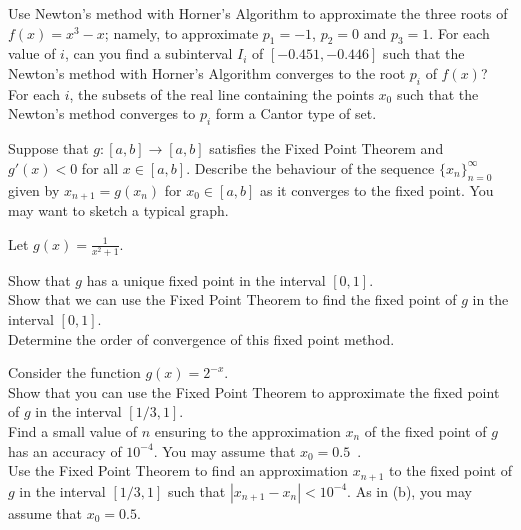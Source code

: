 \begin{question}
Use Newton's method with Horner's Algorithm to approximate the
three roots of $f(x) = x^3 -x$; namely, to approximate $p_1=-1$,
$p_2=0$ and $p_3=1$.  For each value of $i$, can you find a subinterval
$I_i$ of $[-0.451,-0.446]$ such that the Newton's method with Horner's
Algorithm converges to the root $p_i$ of $f(x)$?  For each $i$,
the subsets of the real line containing the points $x_0$ such that
the Newton's method converges to $p_i$ form a Cantor type of set.
\label{solvAQ14}
\end{question}

\begin{question}
Suppose that $g:[a,b] \rightarrow [a,b]$ satisfies the Fixed Point
Theorem and $g'(x) < 0$ for all $x \in [a,b]$.  Describe the behaviour
of the sequence $\{ x_n\}_{n=0}^\infty$ given by $x_{n+1} = g(x_n)$
for $x_0 \in [a,b]$ as it converges to the fixed point.  You may want
to sketch a typical graph.
\label{solvAQ15}
\end{question}

\begin{question}
Let $\displaystyle g(x) = \frac{1}{x^2+1}$.

 Show that $g$ has a unique fixed point in the interval $[0,1]$.\\
 Show that we can use the Fixed Point Theorem to find the
fixed point of $g$ in the interval $[0,1]$.\\
 Determine the order of convergence of this fixed point method.
\label{solvAQ16}
\end{question}

\begin{question}
Consider the function $g(x)=2^{-x}$.\\
 Show that you can use the Fixed Point Theorem to approximate
the fixed point of $g$ in the interval $[1/3,1]$.\\
 Find a small value of $n$ ensuring to the approximation $x_n$
of the fixed point of $g$ has an accuracy of $10^{-4}$.  You may
assume that $x_0=0.5$\ .\\
 Use the Fixed Point Theorem to find an approximation
$x_{n+1}$ to the fixed point of $g$ in the interval $[1/3,1]$ such
that $|x_{n+1} - x_n| < 10^{-4}$.  As in (b), you may assume that
$x_0=0.5$.
\label{solvAQ17}
\end{question}

